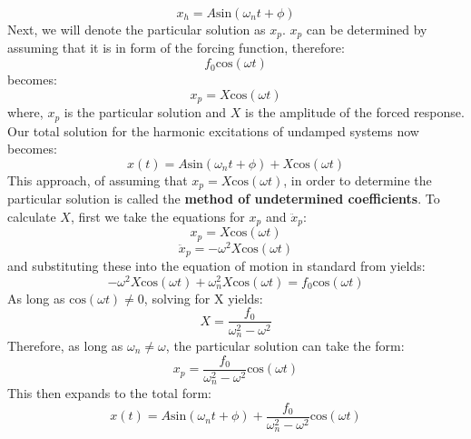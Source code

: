 \documentclass[12pt,letter]{article}
\numberwithin{ex}{section} %
\numberwithin{re}{section} %
\begin{document}
			\begin{equation}
				x_h = A\text{sin}(\omega_n t + \phi)
			\end{equation}			
			Next, we will denote the particular solution as $x_p$. $x_p$ can be determined by assuming that it is in form of the forcing function, therefore:
			\begin{equation}
				f_0\text{cos}(\omega t)
			\end{equation}	
			becomes:
			\begin{equation}
				x_p  =X\text{cos}(\omega t)
			\end{equation}						
			where, $x_p$ is the particular solution and $X$ is the amplitude of the forced response. Our total solution for the harmonic excitations of undamped systems now becomes:
			\begin{equation}
				x(t) = A\text{sin}(\omega_n t + \phi) + X\text{cos}(\omega t) 
			\end{equation}				
			This approach, of assuming that $x_p=X\text{cos}(\omega t)$, in order to determine the particular solution is called the \textbf{method of undetermined coefficients}. To calculate $X$, first we take the equations for $x_p$ and $\ddot{x}_p $:
			\begin{equation}
				x_p = X\text{cos}(\omega t)
			\end{equation}	
			\begin{equation}
				\ddot{x}_p = -\omega^2X\text{cos}(\omega t)
			\end{equation}				
			and substituting these into the equation of motion in standard from yields:
			\begin{equation}
				-\omega^2X\text{cos}(\omega t)+\omega_n^2X\text{cos}(\omega t) = f_0\text{cos}(\omega t)
			\end{equation}		
			As long as 	$\text{cos}(\omega t) \neq  0$, solving for X yields:
			\begin{equation}
				X = \frac{f_0}{\omega_n^2-\omega^2}
				\label{eq:X}
			\end{equation}		
			Therefore, as long as $\omega_n \neq \omega$, the particular solution can take the form:
			\begin{equation}
				x_p = \frac{f_0}{\omega_n^2-\omega^2}\text{cos}(\omega t)
			\end{equation}						
			This then expands to the total form:
			\begin{equation}
				x(t) = A\text{sin}(\omega_n t + \phi) + \frac{f_0}{\omega_n^2-\omega^2}\text{cos}(\omega t)
			\end{equation}				
\end{document}

